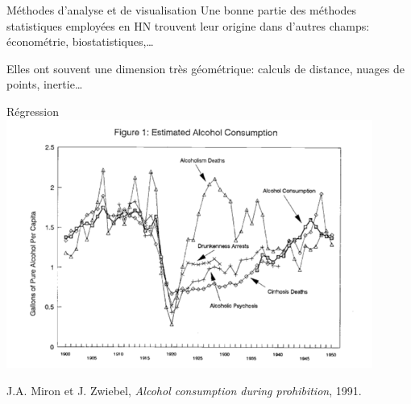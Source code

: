 \documentclass[ignorenonframetext]{beamer}
\begin{document}
\begin{frame}{Méthodes d'analyse et de visualisation}
	Une bonne partie des méthodes statistiques employées en HN trouvent leur origine dans d'autres champs: économétrie, biostatistiques,…
	
	Elles ont souvent une dimension très géométrique: calculs de distance, nuages de points, inertie…
\end{frame}

\begin{frame}{Régression}
\centering
		\includegraphics[width=0.9\textwidth]{img/Miron-proxy.png}

{\small J.A. Miron et J. Zwiebel, \textit{Alcohol
consumption during prohibition}, 1991.}

\end{frame}
\end{document}
